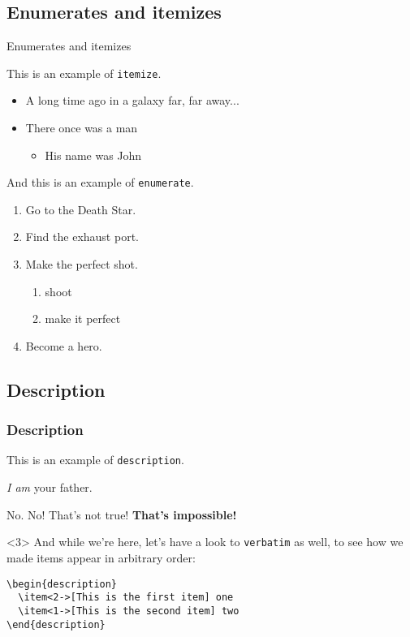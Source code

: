 \documentclass[usenames,dvipsnames,]{beamer}
\begin{document}
\subsection{Enumerates and itemizes}

\begin{frame}{Enumerates and itemizes}

This is an example of \texttt{itemize}.
\begin{itemize}
	\item A long time ago in a galaxy far, far away...
	\item There once was a man
	\begin{itemize}
	    \item His name was John
	\end{itemize}
\end{itemize}
And this is an example of \texttt{enumerate}.

\begin{enumerate} 
  \item Go to the Death Star.
  \item Find the exhaust port.
  \item Make the perfect shot.
  \begin{enumerate}
      \item shoot
      \item make it perfect
  \end{enumerate}
  \item Become a hero.
\end{enumerate}
\end{frame}

\subsection{Description}

\begin{frame}[fragile]
\frametitle{Description}
This is an example of \texttt{description}.

\begin{description}
\item<2->[Vader] \emph{I am} your father.
\item<1->[Luke] No. No! That's not true! \textbf{That's impossible!}
\end{description}

\begin{uncoverenv}<3>
  \vskip 0.5cm
  And while we're here, let's have a look to \texttt{verbatim} as well, to see how we made items appear in arbitrary order:
  \vskip 0.5cm
  \begin{verbatim}
\begin{description}
  \item<2->[This is the first item] one
  \item<1->[This is the second item] two
\end{description}
  \end{verbatim}
\end{uncoverenv}

\end{frame}
\end{document}
